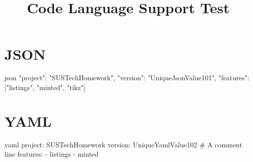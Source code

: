 \documentclass[code=listings]{SUSTechHomework}
\title{Code Language Support Test}
\begin{document}
\maketitle

\section{JSON}

\begin{sustechcode}{json}
{
  "project": "SUSTechHomework",
  "version": "UniqueJsonValue101",
  "features": ["listings", "minted", "tikz"]
}
\end{sustechcode}

\section{YAML}

\begin{sustechcode}{yaml}
project: SUSTechHomework
version: UniqueYamlValue102
# A comment line
features:
  - listings
  - minted
\end{sustechcode}
\end{document}
